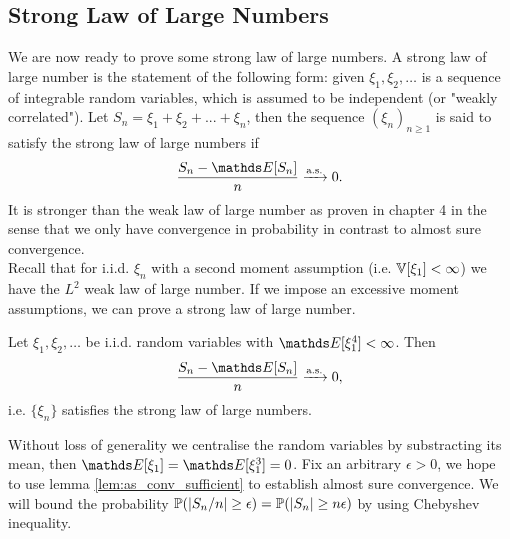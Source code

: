 \subsection{Strong Law of Large Numbers}
We are now ready to prove some strong law of large numbers. A strong law of large number is the statement of the following form: given $\xi_1, \xi_2, \dots$ is a sequence of integrable random variables, which is assumed to be independent (or "weakly correlated"). Let $S_n = \xi_1 + \xi_2 + ... + \xi_n$, then the sequence $(\xi_n)_{n\geq 1}$ is said to satisfy the strong law of large numbers if 
\begin{equation*}
    \frac{S_n - \E[S_n]}{n} \xrightarrow{\text{a.s.}} 0.
\end{equation*}
It is stronger than the weak law of large number as proven in chapter 4 in the sense that we only have convergence in probability in contrast to almost sure convergence. \\

Recall that for i.i.d. $\xi_n$ with a second moment assumption (i.e. $\mathbb{V}[\xi_1] < \infty$) we have the $L^2$ weak law of large number. If we impose an excessive moment assumptions, we can prove a strong law of large number.

\begin{proposition}
Let $\xi_1, \xi_2, \dots$ be i.i.d. random variables with $\E[\xi_1^4] < \infty$. Then
\begin{equation}
    \frac{S_n - \E[S_n]}{n} \xrightarrow{\text{a.s.}} 0,
\end{equation}
i.e. $\{ \xi_n \}$ satisfies the strong law of large numbers.
\end{proposition}

\begin{hint}
Without loss of generality we centralise the random variables by substracting its mean, then $\E[\xi_1] = \E[\xi_1^3] = 0$. Fix an arbitrary $\epsilon > 0$, we hope to use lemma \ref{lem:as_conv_sufficient} to establish almost sure convergence. We will bound the probability $\mathbb{P}(|S_n/n| \geq \epsilon) = \mathbb{P}(|S_n| \geq n\epsilon)$ by using Chebyshev inequality.
\end{hint}

